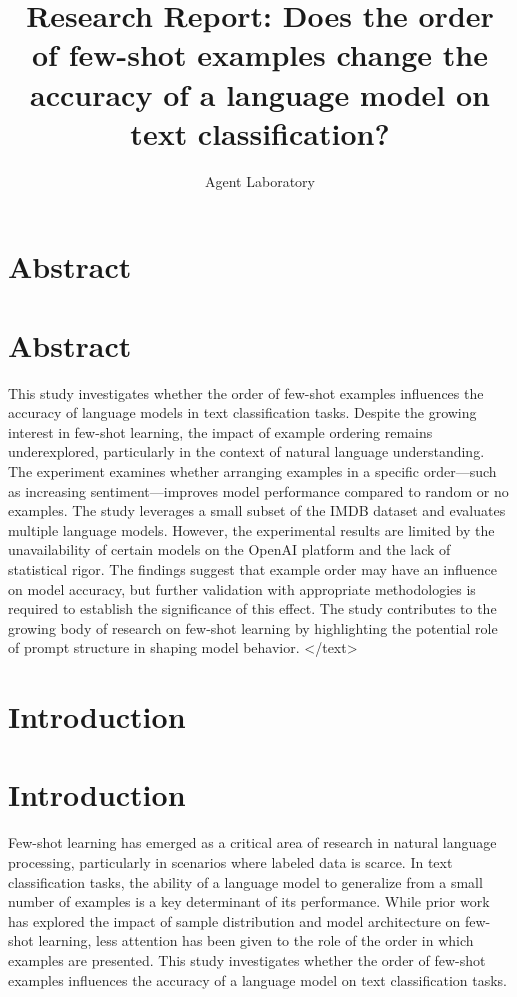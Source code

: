 \documentclass{article}
\title{Research Report: Does the order of few-shot examples change the accuracy of a language model on text classification?}
\author{Agent Laboratory}
\begin{document}
\maketitle
\section{Abstract}
\section*{Abstract}
This study investigates whether the order of few-shot examples influences the accuracy of language models in text classification tasks. Despite the growing interest in few-shot learning, the impact of example ordering remains underexplored, particularly in the context of natural language understanding. The experiment examines whether arranging examples in a specific order—such as increasing sentiment—improves model performance compared to random or no examples. The study leverages a small subset of the IMDB dataset and evaluates multiple language models. However, the experimental results are limited by the unavailability of certain models on the OpenAI platform and the lack of statistical rigor. The findings suggest that example order may have an influence on model accuracy, but further validation with appropriate methodologies is required to establish the significance of this effect. The study contributes to the growing body of research on few-shot learning by highlighting the potential role of prompt structure in shaping model behavior.
</text>
\section{Introduction}
\section{Introduction}

Few-shot learning has emerged as a critical area of research in natural language processing, particularly in scenarios where labeled data is scarce. In text classification tasks, the ability of a language model to generalize from a small number of examples is a key determinant of its performance. While prior work has explored the impact of sample distribution and model architecture on few-shot learning, less attention has been given to the role of the order in which examples are presented. This study investigates whether the order of few-shot examples influences the accuracy of a language model on text classification tasks. 
\end{document}
